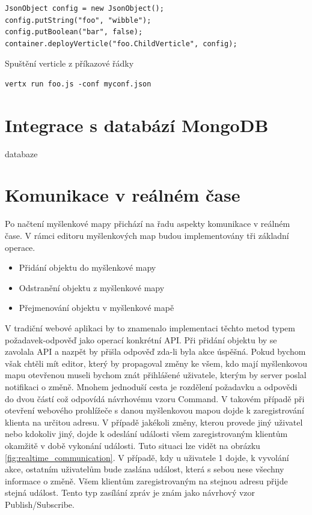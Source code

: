 \begin{lstlisting}
JsonObject config = new JsonObject();
config.putString("foo", "wibble");
config.putBoolean("bar", false);
container.deployVerticle("foo.ChildVerticle", config);
\end{lstlisting}

Spuštění verticle z příkazové řádky
\begin{lstlisting}
vertx run foo.js -conf myconf.json
\end{lstlisting}

\section{Integrace s databází MongoDB}

databaze

\section{Komunikace v reálném čase}\label{sec:realTimeCommunication}

Po načtení myšlenkové mapy přichází na řadu aspekty komunikace v reálném čase. V rámci editoru myšlenkových map budou implementovány tři základní operace.
\begin{itemize}
\item Přidání objektu do myšlenkové mapy
\item Odstranění objektu z myšlenkové mapy
\item Přejmenování objektu v myšlenkové mapě
\end{itemize}
V tradiční webové aplikaci by to znamenalo implementaci těchto metod typem požadavek-odpověď jako operací konkrétní API. Při přidání objektu by se zavolala API a nazpět by přišla odpověď zda-li byla akce úspěšná. Pokud bychom však chtěli mít editor, který by propagoval změny ke všem, kdo mají myšlenkovou mapu otevřenou museli bychom znát přihlášené uživatele, kterým by server poslal notifikaci o změně. Mnohem jednoduší cesta je rozdělení požadavku a odpovědi do dvou částí což odpovídá návrhovému vzoru Command. V takovém případě při otevření webového prohlížeče s danou myšlenkovou mapou dojde k zaregistrování klienta na určitou adresu. V případě jakékoli změny, kterou provede jiný uživatel nebo kdokoliv jiný, dojde k odeslání události všem zaregistrovaným klientům okamžitě v době vykonání události. Tuto situaci lze vidět na obrázku \ref{fig:realtime_communication}. V případě, kdy u uživatele 1 dojde, k vyvolání akce, ostatním uživatelům bude zaslána událost, která s sebou nese všechny informace o změně. Všem klientům zaregistrovaným na stejnou adresu přijde stejná událost. Tento typ zasílání zpráv je znám jako návrhový vzor Publish/Subscribe.

